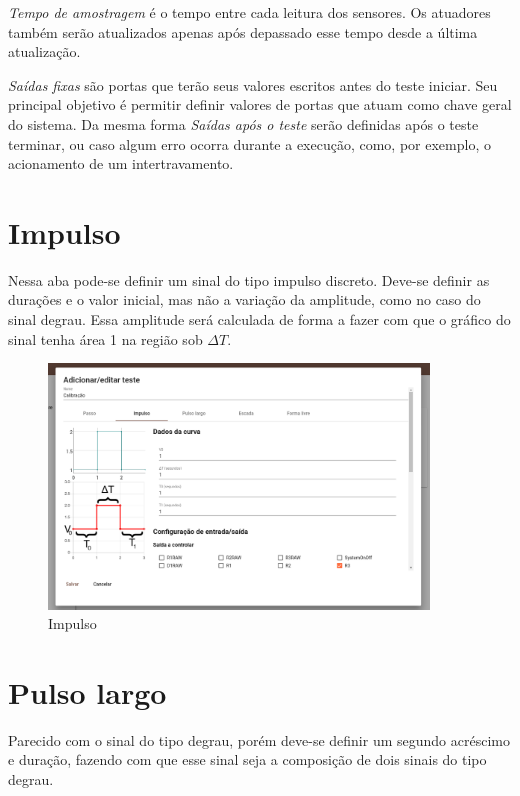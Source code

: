 \textit{Tempo de amostragem} é o tempo entre cada leitura dos sensores. Os
atuadores também serão atualizados apenas após depassado esse tempo desde a
última atualização.

\textit{Saídas fixas} são portas que terão seus valores escritos antes do teste
iniciar. Seu principal objetivo é permitir definir valores de portas que atuam
como chave geral do sistema. Da mesma forma \textit{Saídas após o teste} serão
definidas após o teste terminar, ou caso algum erro ocorra durante a execução,
como, por exemplo, o acionamento de um intertravamento.

\newpage{}
\section{Impulso}%
\label{sec:impulse}

Nessa aba pode-se definir um sinal do tipo impulso discreto. Deve-se definir as
durações e o valor inicial, mas não a variação da amplitude, como no caso do
sinal degrau. Essa amplitude será calculada de forma a fazer com que o gráfico
do sinal tenha área 1 na região sob \(\Delta{}T\).

\begin{figure}[ht!]
    \centering
    \includegraphics[width=0.9\textwidth]{imgs/system-response4}
    \caption[Impulso]{Impulso}%
    \label{fig:system-response4}
\end{figure}

\newpage{}
\section{Pulso largo}%
\label{sec:wide-pulse}

Parecido com o sinal do tipo degrau, porém deve-se definir um segundo acréscimo
e duração, fazendo com que esse sinal seja a composição de dois sinais do tipo
degrau.

